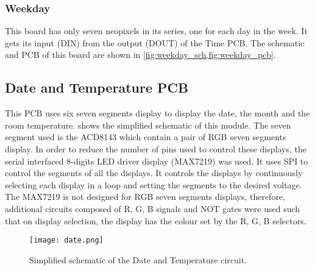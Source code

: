 \subsubsection{Weekday}
This board has only seven neopixels in its series, one for each day in the week. It gets its input (DIN) from the output (DOUT) of the Time PCB.
The schematic and PCB of this board are shown in \cref{fig:weekday_sch,fig:weekday_pcb}.

\subsection{Date and Temperature PCB}
This PCB uses six seven segments display to display the date, the month and the room temperature.  shows the simplified schematic of this module. The seven segment used is the ACD8143 which contain a pair of RGB seven segments display. In order to reduce the number of pins used to control these displays, the serial interfaced 8-digits LED driver display (MAX7219) was used. It uses SPI to control the segments of all the displays. It controls the displays by continuously selecting each display in a loop and setting the segments to the desired voltage. The MAX7219 is not designed for RGB seven segments displays, therefore, additional circuits composed of R, G, B signals and NOT gates were used such that on display selection, the display has the colour set by the R, G, B selectors.   
\begin{figure}[ht]
\centering
\texttt{[image: date.png]}
\caption{Simplified schematic of the Date and Temperature circuit.}
\label{fig:date}
\end{figure}